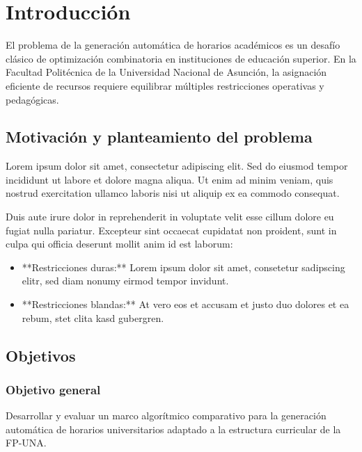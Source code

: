 \chapter{Introducción}
\label{chap:introduccion}

El problema de la generación automática de horarios académicos es un desafío clásico de
optimización combinatoria en instituciones de educación superior. En la Facultad Politécnica de la
Universidad Nacional de Asunción, la asignación eficiente de recursos requiere equilibrar múltiples
restricciones operativas y pedagógicas.
~\cite{prime-number-theorem}

\section{Motivación y planteamiento del problema}

Lorem ipsum dolor sit amet, consectetur adipiscing elit. Sed do eiusmod tempor incididunt ut labore
et dolore magna aliqua. Ut enim ad minim veniam, quis nostrud exercitation ullamco laboris nisi ut
aliquip ex ea commodo consequat.
~\cite{miticagenda}

Duis aute irure dolor in reprehenderit in voluptate velit esse cillum dolore eu fugiat nulla
pariatur. Excepteur sint occaecat cupidatat non proident, sunt in culpa qui officia deserunt mollit
anim id est laborum:

\begin{itemize}
    \item **Restricciones duras:** Lorem ipsum dolor sit amet, consetetur sadipscing elitr, sed
        diam nonumy eirmod tempor invidunt.
    \item **Restricciones blandas:** At vero eos et accusam et justo duo dolores et ea rebum, stet
        clita kasd gubergren.
\end{itemize}

\section{Objetivos}

\subsection{Objetivo general}

Desarrollar y evaluar un marco algorítmico comparativo para la generación automática de horarios
universitarios adaptado a la estructura curricular de la FP-UNA.

